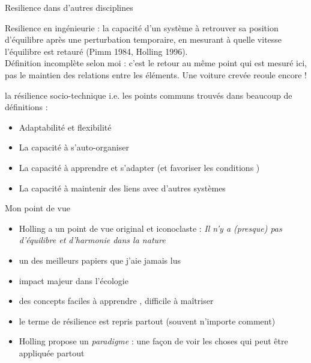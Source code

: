 \documentclass[11,aspectratio=1610]{beamer}
\begin{document}
\begin{frame}{Resilience dans d'autres disciplines}

\begin{small}
\alert{Resilience en ingénieurie} : la capacité d'un système à retrouver sa position d'équilibre après une perturbation \alert{temporaire}, en mesurant à quelle vitesse l'équilibre est retauré (Pimm 1984, Holling 1996).\\
Définition incomplète selon moi : c'est le retour au même point qui est mesuré ici, pas le maintien des relations entre les éléments. Une voiture crevée reoule encore !

\vfill

\alert{la résilience socio-technique }  i.e. les points communs trouvés dans beaucoup de définitions : 
\begin{itemize}
  \item  \alert{Adaptabilité} et flexibilité 
  \item  La capacité à s'auto-organiser 
  \item  La capacité à  \alert{apprendre et s'adapter} (et favoriser les conditions )
  \item  La capacité à maintenir des \alert{liens}  avec d'autres systèmes 
  \end{itemize}
\end{small}


\end{frame}



\begin{frame}{Mon point de vue}

\begin{itemize}
\item  Holling a un point de vue original et iconoclaste : \alert{\textit{Il n'y a (presque) pas d'équilibre et d'harmonie dans la nature}}
\item un des meilleurs papiers que j'aie jamais lus 
\item impact majeur dans l'écologie 
\item des concepts faciles à apprendre , difficile à maîtriser 
\item le terme de résilience est repris partout (souvent n'importe comment)
\item Holling propose un \textit{paradigme} : une façon de voir les choses qui peut être appliquée partout 
\end{itemize}


\end{frame}
\end{document}
